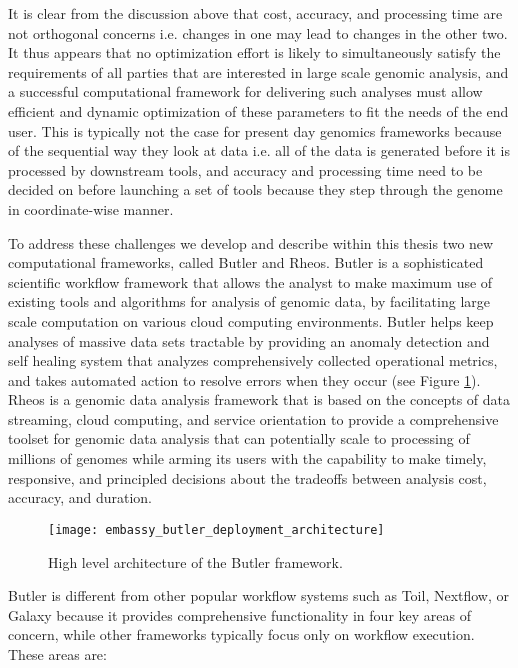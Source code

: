 It is clear from the discussion above that cost, accuracy, and processing time are not orthogonal concerns i.e. changes in one may lead to changes in the other two. It thus appears that no optimization effort is likely to simultaneously satisfy the requirements of all parties that are interested in large scale genomic analysis, and a successful computational framework for delivering such analyses must allow efficient and dynamic optimization of these parameters to fit the needs of the end user. This is typically not the case for present day genomics frameworks because of the sequential way they look at data\autocite{mckenna2010genome, van2013fastq} i.e. all of the data is generated before it is processed by downstream tools, and accuracy and processing time need to be decided on before launching a set of tools because they step through the genome in coordinate-wise manner.

To address these challenges we develop and describe within this thesis two new computational frameworks, called Butler and Rheos. Butler is a sophisticated scientific workflow framework that allows the analyst to make maximum use of existing tools and algorithms for analysis of genomic data, by facilitating large scale computation on various cloud computing environments. Butler helps keep analyses of massive data sets tractable by providing an anomaly detection and self healing system that analyzes comprehensively collected operational metrics, and takes automated action to resolve errors when they occur (see Figure \ref{fig:butler_architecture}). Rheos is a genomic data analysis framework that is based on the concepts of data streaming, cloud computing, and service orientation to provide a comprehensive toolset for genomic data analysis that can potentially scale to processing of millions of genomes while arming its users with the capability to make timely, responsive, and principled decisions about the tradeoffs between analysis cost, accuracy, and duration.

\begin{figure}[h!]
\texttt{[image: embassy\_butler\_deployment\_architecture]}
\centering
\caption {High level architecture of the Butler framework.}
\label{fig:butler_architecture}
\end{figure}

Butler is different from other popular workflow systems such as Toil\autocite{vivian2017toil}, Nextflow\autocite{di2017nextflow}, or Galaxy\autocite{goecks2010galaxy} because it provides comprehensive functionality in four key areas of concern, while other frameworks typically focus only on workflow execution. These areas are:

